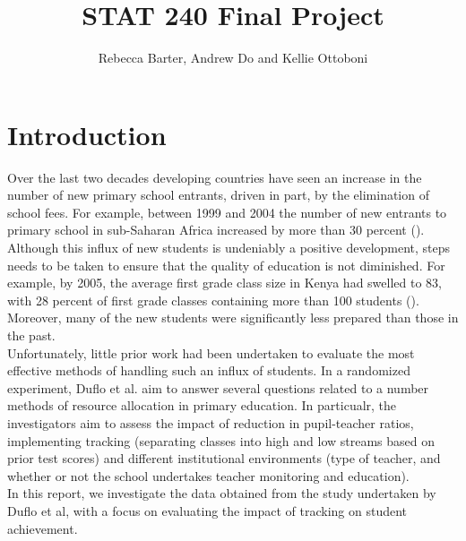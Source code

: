 \documentclass[11pt]{article}
\title{STAT 240 Final Project}
\author{Rebecca Barter, Andrew Do and Kellie Ottoboni}
\begin{document}
\maketitle

 \section{Introduction}
Over the last two decades developing countries have seen an increase in the number of new primary school entrants, driven in part, by the elimination of school fees. For example, between 1999 and 2004 the number of new entrants to primary school in sub-Saharan Africa increased by more than 30 percent (\cite{unesco2007}). Although this influx of new students is undeniably a positive development, steps needs to be taken to ensure that the quality of education is not diminished. For example, by 2005, the average first grade class size in Kenya had swelled to 83, with 28 percent of first grade classes containing more than 100 students (\cite{duflo2007}). Moreover, many of the new students were significantly less prepared than those in the past.\\

Unfortunately, little prior work had been undertaken to evaluate the most effective methods of handling such an influx of students. In a randomized experiment, Duflo et al. aim to answer several questions related to a number methods of resource allocation in primary education. In particualr, the investigators aim to assess the impact of reduction in pupil-teacher ratios, implementing tracking (separating classes into high and low streams based on prior test scores) and different institutional environments (type of teacher, and whether or not the school undertakes teacher monitoring and education).\\

In this report, we investigate the data obtained from the study undertaken by Duflo et al, with a focus on evaluating the impact of tracking on student achievement. 
 
\end{document}
